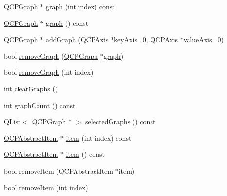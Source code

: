 \begin{DoxyCompactItemize}
\item 
\mbox{\hyperlink{class_q_c_p_graph}{Q\+C\+P\+Graph}} $\ast$ \mbox{\hyperlink{class_q_custom_plot_a6ecae130f684b25276fb47bd3a5875c6}{graph}} (int index) const
\item 
\mbox{\hyperlink{class_q_c_p_graph}{Q\+C\+P\+Graph}} $\ast$ \mbox{\hyperlink{class_q_custom_plot_aac190865a67f19af3fdf2136774997af}{graph}} () const
\item 
\mbox{\hyperlink{class_q_c_p_graph}{Q\+C\+P\+Graph}} $\ast$ \mbox{\hyperlink{class_q_custom_plot_a6fb2873d35a8a8089842d81a70a54167}{add\+Graph}} (\mbox{\hyperlink{class_q_c_p_axis}{Q\+C\+P\+Axis}} $\ast$key\+Axis=0, \mbox{\hyperlink{class_q_c_p_axis}{Q\+C\+P\+Axis}} $\ast$value\+Axis=0)
\item 
bool \mbox{\hyperlink{class_q_custom_plot_a903561be895fb6528a770d66ac5e6713}{remove\+Graph}} (\mbox{\hyperlink{class_q_c_p_graph}{Q\+C\+P\+Graph}} $\ast$\mbox{\hyperlink{class_q_custom_plot_a6ecae130f684b25276fb47bd3a5875c6}{graph}})
\item 
bool \mbox{\hyperlink{class_q_custom_plot_a9554b3d2d5b10c0f884bd4010b6c192c}{remove\+Graph}} (int index)
\item 
int \mbox{\hyperlink{class_q_custom_plot_ab0f3abff2d2f7df3668b5836f39207fa}{clear\+Graphs}} ()
\item 
int \mbox{\hyperlink{class_q_custom_plot_a5e1787cdde868c4d3790f9ebc8207d90}{graph\+Count}} () const
\item 
Q\+List$<$ \mbox{\hyperlink{class_q_c_p_graph}{Q\+C\+P\+Graph}} $\ast$ $>$ \mbox{\hyperlink{class_q_custom_plot_ad3547aded026d8a9ae6ef13a69080d06}{selected\+Graphs}} () const
\item 
\mbox{\hyperlink{class_q_c_p_abstract_item}{Q\+C\+P\+Abstract\+Item}} $\ast$ \mbox{\hyperlink{class_q_custom_plot_ac042f2e78edd228ccf2f26b7fe215239}{item}} (int index) const
\item 
\mbox{\hyperlink{class_q_c_p_abstract_item}{Q\+C\+P\+Abstract\+Item}} $\ast$ \mbox{\hyperlink{class_q_custom_plot_a12eb2a283cf10a8a9176c01c0443e83e}{item}} () const
\item 
bool \mbox{\hyperlink{class_q_custom_plot_ae04446557292551e8fb6e2c106e1848d}{remove\+Item}} (\mbox{\hyperlink{class_q_c_p_abstract_item}{Q\+C\+P\+Abstract\+Item}} $\ast$\mbox{\hyperlink{class_q_custom_plot_ac042f2e78edd228ccf2f26b7fe215239}{item}})
\item 
bool \mbox{\hyperlink{class_q_custom_plot_abcfdda3d601c0441cab136137d715dea}{remove\+Item}} (int index)
\item 

\end{DoxyCompactItemize}
